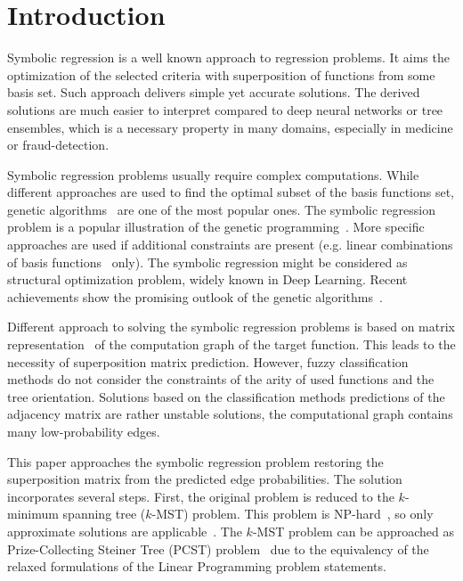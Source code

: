 \documentclass[11pt, tightenlines, twoside, onecolumn, nofloats, nobibnotes, nofootinbib, superscriptaddress, noshowpacks, centertags]{revtex4}
\begin{document}


\maketitle


\section{Introduction}
Symbolic regression is a well known approach to regression problems. It aims the optimization of the selected criteria with superposition of functions from some basis set. Such approach delivers simple yet accurate solutions. The derived solutions are much easier to interpret compared to deep neural networks or tree ensembles, which is a necessary property in many domains, especially in medicine or fraud-detection.

Symbolic regression problems usually require complex computations. While different approaches are used to find the optimal subset of the basis functions set, genetic algorithms~\cite{davis1991handbook} are one of the most popular ones. The symbolic regression problem is a popular illustration of the genetic programming~\cite{koza1994genetic}. More specific approaches are used if additional constraints are present (e.g. linear combinations of basis functions~\cite{searson2010gptips,searson2015gptips} only).
The symbolic regression might be considered as structural optimization problem, widely known in Deep Learning. Recent achievements show the promising outlook of the genetic algorithms~\cite{evolving2002,wann2019}.

Different approach to solving the symbolic regression problems is based on matrix representation~\cite{Bochkarev2017} of the computation graph of the target function. This leads to the necessity of superposition matrix prediction. However, fuzzy classification methods do not consider the constraints of the arity of used functions and the tree orientation. Solutions based on the classification methods predictions of the adjacency matrix are rather unstable solutions, the computational graph contains many low-probability edges.

This paper approaches the symbolic regression problem restoring the superposition matrix from the predicted edge probabilities. The solution incorporates several steps. First, the original problem is reduced to the $k$-minimum spanning tree ($k$-MST) problem. This problem is NP-hard~\cite{lozovanu1993minimal}, so only approximate solutions are applicable~\cite{ravi1996spanning}. The $k$-MST problem can be approached as Prize-Collecting Steiner Tree (PCST) problem~\cite{Chudak2004} due to the equivalency of the relaxed formulations of the Linear Programming problem statements.
\end{document}
